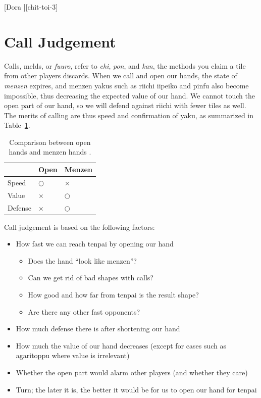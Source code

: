 \documentclass[12pt]{article}
\begin{document}
[Dora ][chit-toi-3]

\section{Call Judgement}

Calls, melds, or \textit{fuuro}, refer to \textit{chi}, \textit{pon}, and \textit{kan}, the methods you claim a tile from other players discards. When we call and open our hands, the state of \textit{menzen} expires, and menzen yakus such as riichi iipeiko and pinfu also become impossible, thus decreasing the expected value of our hand. We cannot touch the open part of our hand, so we will defend against riichi with fewer tiles as well. The merits of calling are thus speed and confirmation of yaku, as summarized in Table~\ref{tab:naki-compare}.

\begin{table}[ht]
  \centering
  \begin{tabular}{lll}
    & Open & Menzen \\
    \hline
    Speed & $\bigcirc$ & $\times$ \\
    Value & $\times$ & $\bigcirc$ \\
    Defense & $\times$ & $\bigcirc$
  \end{tabular}
  \caption{Comparison between open hands and menzen hands \citep[][p.~87]{hirasawa-naki}.}
  \label{tab:naki-compare}
\end{table}

Call judgement is based on the following factors:

\begin{itemize}
  \item How fast we can reach tenpai by opening our hand
  \begin{itemize}
    \item Does the hand ``look like menzen''?
    \item Can we get rid of bad shapes with calls?
    \item How good and how far from tenpai is the result shape?
    \item Are there any other fast opponents?
  \end{itemize}
  \item How much defense there is after shortening our hand
  \item How much the value of our hand decreases (except for cases such as agaritoppu where value is irrelevant)
  \item Whether the open part would alarm other players (and whether they care)
  \item Turn; the later it is, the better it would be for us to open our hand for tenpai
\end{itemize}
\end{document}
